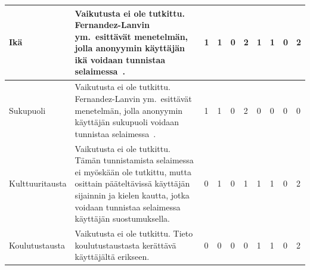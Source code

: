 \documentclass[finnish, 12pt, a4paper, elec, utf8, a-1b, online]{aaltothesis}
\begin{document}
{\begin{longtable}{p{2.5cm}|p{6cm}|p{0.5cm}p{0.5cm}p{0.5cm}|p{0.5cm}|p{0.5cm}p{0.5cm}p{0.5cm}|p{0.5cm}|}
    \midrule
    Ikä                                    & Vaikutusta ei ole tutkittu. Fernandez-Lanvin ym.\ esittävät menetelmän, jolla anonyymin käyttäjän ikä voidaan tunnistaa selaimessa~\cite{fernandez2018dimension}.                                                                                                                                                                       & 1                                          & 1                                   & 0                                      & 2                            & 1                                               & 1                                         & 0                                         & 2                            \\
    \midrule
    Sukupuoli                              & Vaikutusta ei ole tutkittu. Fernandez-Lanvin ym.\ esittävät menetelmän, jolla anonyymin käyttäjän sukupuoli voidaan tunnistaa selaimessa~\cite{fernandez2018dimension}.                                                                                                                                                                 & 1                                          & 1                                   & 0                                      & 2                            & 0                                               & 0                                         & 0                                         & 0                            \\
    \midrule
    Kulttuuritausta                        & Vaikutusta ei ole tutkittu. Tämän tunnistamista selaimessa ei myöskään ole tutkittu, mutta osittain pääteltävissä käyttäjän sijainnin ja kielen kautta, jotka voidaan tunnistaa selaimessa käyttäjän suostumuksella.                                                                                                                    & 0                                          & 1                                   & 0                                      & 1                            & 1                                               & 1                                         & 0                                         & 2                            \\
    \midrule
    Koulutustausta                         & Vaikutusta ei ole tutkittu. Tieto koulutustaustasta kerättävä käyttäjältä erikseen.                                                                                                                                                                                                                                                     & 0                                          & 0                                   & 0                                      & 0                            & 1                                               & 1                                         & 0                                         & 2                            \\

\end{longtable}}
\end{document}
